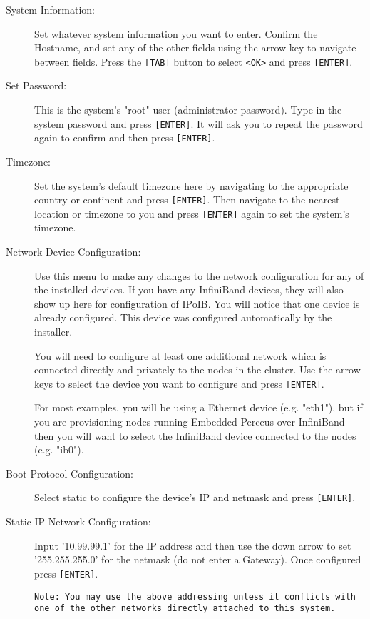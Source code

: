\documentclass[10pt,letterpaper]{article}
\begin{document}
\begin{description}

\item[System Information:] Set whatever system information you want
to enter. Confirm the Hostname, and set any of the other fields using the
arrow key to navigate between fields. Press the {\tt [TAB]} button to
select {\tt <OK>} and press {\tt [ENTER]}.

\item[Set Password:] This is the system's "root" user (administrator
password). Type in the system password and press {\tt [ENTER]}. It will
ask you to repeat the password again to confirm and then press
{\tt [ENTER]}.

\item[Timezone:] Set the system's default timezone here by navigating to
the appropriate country or continent and press {\tt [ENTER]}. Then
navigate to the nearest location or timezone to you and press {\tt [ENTER]}
again to set the system's timezone.

\item[Network Device Configuration:] Use this menu to make any changes
to the network configuration for any of the installed devices. If you have
any InfiniBand devices, they will also show up here for configuration of
IPoIB. You will notice that one device is already configured. This device
was configured automatically by the installer.

You will need to configure at least one additional network which is connected
directly and privately to the nodes in the cluster. Use the arrow keys to
select the device you want to configure and press {\tt [ENTER]}.

For most examples, you will be using a Ethernet device (e.g. "eth1"), but if
you are provisioning nodes running Embedded Perceus over InfiniBand then you
will want to select the InfiniBand device connected to the nodes (e.g. "ib0").

\item[Boot Protocol Configuration:] Select static to configure the
device's IP and netmask and press {\tt [ENTER]}.

\item[Static IP Network Configuration:] Input '10.99.99.1' for the IP
address and then use the down arrow to set '255.255.255.0' for the netmask
(do not enter a Gateway). Once configured press {\tt [ENTER]}.

{\tt Note: You may use the above addressing unless it conflicts with one of
the other networks directly attached to this system.}


\end{description}
\end{document}
